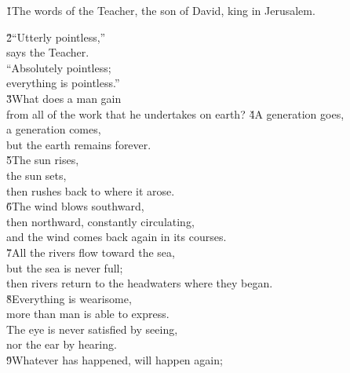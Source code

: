 


\v{1}The words of the Teacher, the son of David, king in Jerusalem.

\begin{poetry}
\poeml \v{2}``Utterly pointless,'' \\
\poemlll       says the Teacher. \\
\poeml ``Absolutely pointless; \\
\poemll    everything is pointless.'' \\
\poeml \v{3}What does a man gain \\
\poemll    from all of the work that he undertakes on earth?
\poeml \v{4}A generation goes, \\
\poemll    a generation comes, \\
\poemlll       but the earth remains forever. \\
\poeml \v{5}The sun rises, \\
\poemll    the sun sets, \\
\poemlll       then rushes back to where it arose. \\
\poeml \v{6}The wind blows southward, \\
\poemll    then northward, constantly circulating, \\
\poemlll       and the wind comes back again in its courses. \\
\poeml \v{7}All the rivers flow toward the sea, \\
\poemll    but the sea is never full; \\
\poemlll       then rivers return to the headwaters where they began. \\
\poeml \v{8}Everything is wearisome, \\
\poemll    more than man is able to express. \\
\poeml The eye is never satisfied by seeing, \\
\poemll    nor the ear by hearing. \\
\poeml \v{9}Whatever has happened, will happen again; \\

\end{poetry}
